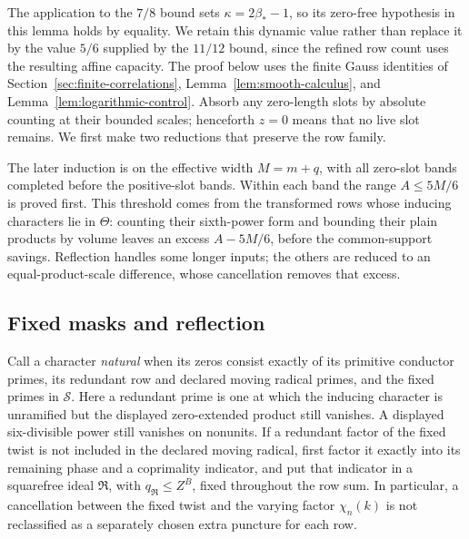 \documentclass[11pt,a4paper]{article}
\numberwithin{equation}{section}
\numberwithin{figure}{section}
\theoremstyle{definition}
\theoremstyle{remark}
\begin{document}
The application to the \(7/8\) bound sets \(\kappa=2\beta_*-1\), so
its zero-free hypothesis in this lemma holds by equality.  We retain this
dynamic value rather than replace it by the value \(5/6\) supplied by the
\(11/12\) bound, since the refined row count uses the resulting affine
capacity.  The proof below uses the
finite Gauss identities of Section~\ref{sec:finite-correlations},
Lemma~\ref{lem:smooth-calculus}, and Lemma~\ref{lem:logarithmic-control}.
Absorb any zero-length slots by absolute counting at their bounded
scales; henceforth \(z=0\) means that no live slot remains.  We first
make two reductions that preserve the row family.

The later induction is on the effective width \(M=m+q\), with all zero-slot
bands completed before the positive-slot bands.  Within each band the range
\(A\le5M/6\) is proved first.  This threshold comes from the
transformed rows whose inducing characters lie in \(\Theta\): counting
their sixth-power form and
bounding their plain products by volume leaves an excess
\(A-5M/6\), before the common-support savings.  Reflection handles
some longer inputs; the others are reduced to an equal-product-scale
difference, whose cancellation removes that excess.

\subsection{Fixed masks and reflection}

Call a character \emph{natural} when its zeros consist exactly of its
primitive conductor primes, its redundant row and declared moving
radical primes, and the fixed primes in \(\mathcal S\).  Here a
redundant prime is one at which the inducing character is unramified
but the displayed zero-extended product still vanishes.  A displayed
six-divisible power still vanishes on nonunits.  If a redundant factor
of the fixed twist is not included in the declared moving radical,
first factor it exactly into its remaining phase and a coprimality
indicator, and put that indicator in a squarefree ideal
\(\mathfrak R\), with \(q_{\mathfrak R}\le Z^B\), fixed throughout
the row sum.  In particular, a cancellation between the fixed twist
and the varying factor \(\chi_n(k)\) is not reclassified as a
separately chosen extra puncture for each row.
\end{document}
